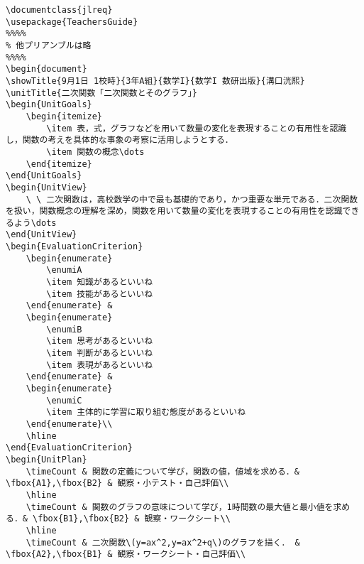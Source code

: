 \documentclass[paper=a4,fontsize=10.5pt]{jlreq}
\begin{document}
\begin{lstlisting}
\documentclass{jlreq}
\usepackage{TeachersGuide}
%%%%
% 他プリアンブルは略
%%%%
\begin{document}
\showTitle{9月1日 1校時}{3年A組}{数学I}{数学I 数研出版}{溝口洸熙}
\unitTitle{二次関数「二次関数とそのグラフ」}
\begin{UnitGoals}
    \begin{itemize}
        \item 表，式，グラフなどを用いて数量の変化を表現することの有用性を認識し，関数の考えを具体的な事象の考察に活用しようとする．
        \item 関数の概念\dots
    \end{itemize}
\end{UnitGoals}
\begin{UnitView}
    \ \ 二次関数は，高校数学の中で最も基礎的であり，かつ重要な単元である．二次関数を扱い，関数概念の理解を深め，関数を用いて数量の変化を表現することの有用性を認識できるよう\dots
\end{UnitView}
\begin{EvaluationCriterion}
    \begin{enumerate}
        \enumiA
        \item 知識があるといいね
        \item 技能があるといいね
    \end{enumerate} &
    \begin{enumerate}
        \enumiB
        \item 思考があるといいね
        \item 判断があるといいね
        \item 表現があるといいね
    \end{enumerate} &
    \begin{enumerate}
        \enumiC
        \item 主体的に学習に取り組む態度があるといいね
    \end{enumerate}\\
    \hline
\end{EvaluationCriterion}
\begin{UnitPlan}
    \timeCount & 関数の定義について学び，関数の値，値域を求める．& \fbox{A1},\fbox{B2} & 観察・小テスト・自己評価\\
    \hline
    \timeCount & 関数のグラフの意味について学び，1時間数の最大値と最小値を求める．& \fbox{B1},\fbox{B2} & 観察・ワークシート\\
    \hline
    \timeCount & 二次関数\(y=ax^2,y=ax^2+q\)のグラフを描く． & \fbox{A2},\fbox{B1} & 観察・ワークシート・自己評価\\

\end{lstlisting}
\end{document}
